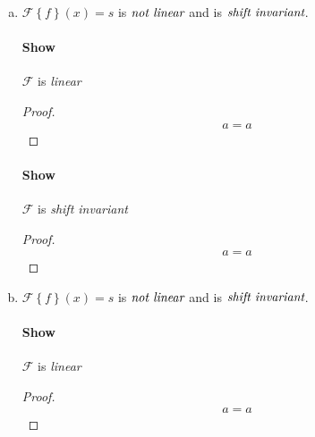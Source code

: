\documentclass{paper}
\begin{document}
\begin{enumerate}[(a)]
\paragraph{Show} $\mathcal{F}$ is \emph{linear} \\
\begin{proof}
\begin{align*}
    a = a
\end{align*}
\end{proof}

\paragraph{Show} $\mathcal{F}$ is \emph{shift invariant} \\
\begin{proof}
\begin{align*}
    a = a
\end{align*}
\end{proof}

\item $\mathcal{F} \left \{ f \right\} (x) = s$ is $\emph{not linear}$ and is $\emph{shift invariant}$.

\paragraph{Show} $\mathcal{F}$ is \emph{linear} \\
\begin{proof}
\begin{align*}
    a = a
\end{align*}
\end{proof}

\paragraph{Show} $\mathcal{F}$ is \emph{shift invariant} \\
\begin{proof}
\begin{align*}
    a = a
\end{align*}
\end{proof}


\item $\mathcal{F} \left \{ f \right\} (x) = s$ is $\emph{not linear}$ and is $\emph{shift invariant}$.

\paragraph{Show} $\mathcal{F}$ is \emph{linear} \\
\begin{proof}
\begin{align*}
    a = a
\end{align*}
\end{proof}


\end{enumerate}
\end{document}
